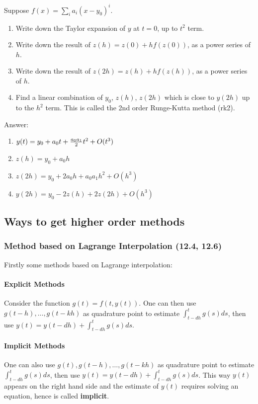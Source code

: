 \documentclass{article} %
\theoremstyle{break}
\begin{document}
Suppose $f(x)=\sum_ia_i(x-y_0)^i$.

\begin{enumerate}
\item Write down the Taylor expansion of $y$ at $t=0$, up to $t^2$ term.
\item Write down the result of $z(h)=z(0)+hf(z(0))$, as a power series of $h$.
\item Write down the result of $z(2h)=z(h)+hf(z(h))$, as a power series of $h$.
\item Find a linear combination of $y_0$, $z(h)$, $z(2h)$ which is close to $y(2h)$ up to the $h^2$ term. This is called the 2nd order Runge-Kutta method (rk2).
\end{enumerate}

Answer:

\begin{enumerate}
\item $y(t)=y_0+a_0t+{a_0a_1\over 2}t^2+O(t^3)$
\item $z(h)=y_0+a_0h$
\item $z(2h)=y_0+2a_0h+a_0a_1h^2+O(h^3)$
\item $y(2h)=y_0-2z(h)+2z(2h)+O(h^3)$
\end{enumerate}



\subsection{Ways to get higher order methods}

\subsubsection{Method based on Lagrange Interpolation (12.4, 12.6)}

Firstly some methods based on Lagrange interpolation:

\paragraph{Explicit Methods} Consider the function $g(t)=f(t, y(t))$. One can then use $g(t-h), \dots, g(t-kh)$ as quadrature point to estimate $\int_{t-dh}^{t}g(s)ds$, then use $y(t)=y(t-dh)+\int_{t-dh}^{t}g(s)ds$.

\paragraph{Implicit Methods} One can also use $g(t), g(t-h), \dots, g(t-kh)$ as quadrature point to estimate $\int_{t-dh}^{t}g(s)ds$, then use $y(t)=y(t-dh)+\int_{t-dh}^{t}g(s)ds$. This way $y(t)$ appears on the right hand side and the estimate of $y(t)$ requires solving an equation, hence is called {\bf implicit}.
\end{document}
